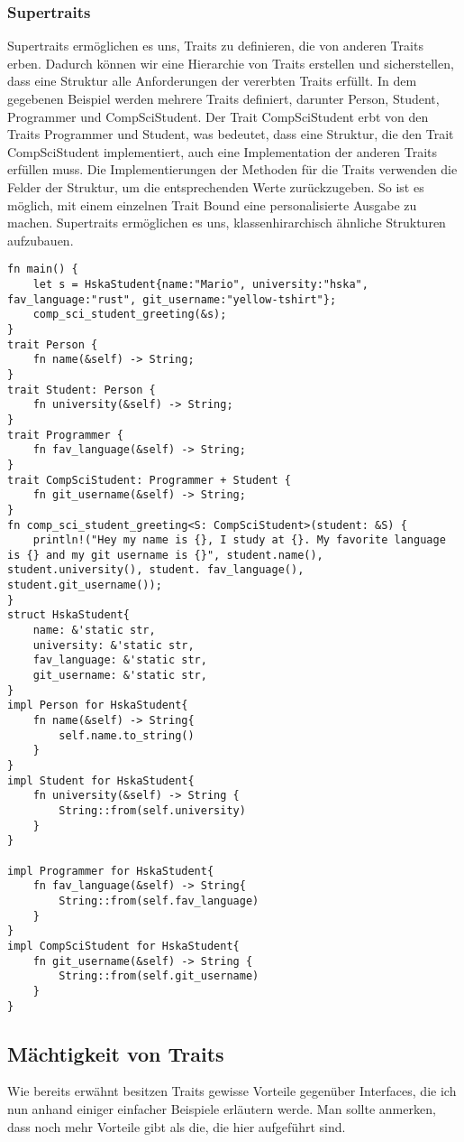 \documentclass[a4paper, 1ppt]{article}
\begin{document}
\subsubsection{Supertraits}
Supertraits ermöglichen es uns, Traits zu definieren, die von anderen Traits erben. Dadurch können wir eine Hierarchie von Traits erstellen und sicherstellen, dass eine Struktur alle Anforderungen der vererbten Traits erfüllt.
In dem gegebenen Beispiel werden mehrere Traits definiert, darunter Person, Student, Programmer und CompSciStudent. Der Trait CompSciStudent erbt von den Traits Programmer und Student, was bedeutet, dass eine Struktur, die den Trait CompSciStudent implementiert, auch eine Implementation der anderen Traits erfüllen muss.
 Die Implementierungen der Methoden für die Traits verwenden die Felder der Struktur, um die entsprechenden Werte zurückzugeben.
So ist es möglich, mit einem einzelnen Trait Bound eine personalisierte Ausgabe zu machen.
Supertraits ermöglichen es uns, klassenhirarchisch ähnliche Strukturen aufzubauen. 
\begin{verbatim}
fn main() {
    let s = HskaStudent{name:"Mario", university:"hska", fav_language:"rust", git_username:"yellow-tshirt"};
    comp_sci_student_greeting(&s);
}
trait Person {
    fn name(&self) -> String;
}
trait Student: Person {
    fn university(&self) -> String;
}
trait Programmer {
    fn fav_language(&self) -> String;
}
trait CompSciStudent: Programmer + Student {
    fn git_username(&self) -> String;
}
fn comp_sci_student_greeting<S: CompSciStudent>(student: &S) {
    println!("Hey my name is {}, I study at {}. My favorite language is {} and my git username is {}", student.name(), student.university(), student. fav_language(), student.git_username());
}
struct HskaStudent{
    name: &'static str,
    university: &'static str,
    fav_language: &'static str,
    git_username: &'static str,
}
impl Person for HskaStudent{
    fn name(&self) -> String{
        self.name.to_string()
    }
}
impl Student for HskaStudent{
    fn university(&self) -> String {
        String::from(self.university)
    }
}

impl Programmer for HskaStudent{
    fn fav_language(&self) -> String{
        String::from(self.fav_language)
    }
}
impl CompSciStudent for HskaStudent{
    fn git_username(&self) -> String {
        String::from(self.git_username)
    }
}
\end{verbatim}
\subsection{Mächtigkeit von Traits}
Wie bereits erwähnt besitzen Traits gewisse Vorteile gegenüber Interfaces, die ich nun anhand einiger einfacher Beispiele erläutern werde.
Man sollte anmerken, dass noch mehr Vorteile gibt als die, die hier aufgeführt sind.
\end{document}
